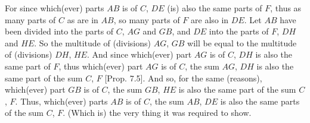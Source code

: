 \begin{Parallel}{}{}
{For since which(ever) parts $AB$ is of $C$, $DE$ (is) also the same parts  of $F$,
thus as many parts of $C$ as are in $AB$, so many 
 parts of $F$ are also in $DE$. Let $AB$ have been divided into the parts of
$C$, $AG$ and $GB$, and $DE$ into the parts of $F$, $DH$ and $HE$. So the
multitude of (divisions) $AG$, $GB$ will be equal to the multitude
of (divisions) $DH$, $HE$. And since which(ever) part $AG$ is of $C$, $DH$ is
also the same part of $F$, thus which(ever) part $AG$ is of $C$, the sum $AG$, $DH$
is  also the same part of the sum $C$, $F$ [Prop. 7.5].  And so, for the same (reasons), 
which(ever) part $GB$ is of $C$, the sum $GB$, $HE$ is also
the same part of the sum $C$, $F$. Thus, which(ever) parts $AB$ is of $C$, the
sum $AB$, $DE$ is also the same parts of the sum $C$, $F$. (Which is)
the very thing it was required to show.}
\end{Parallel}


\vspace{7pt}{\footnotesize\noindent$^\dag$ In modern notation,
this proposition states that if $a = (m/n)\,b$ and $c=(m/n)\,d$
then $(a+c) = (m/n)\,(b+d)$, where all symbols denote numbers.}

